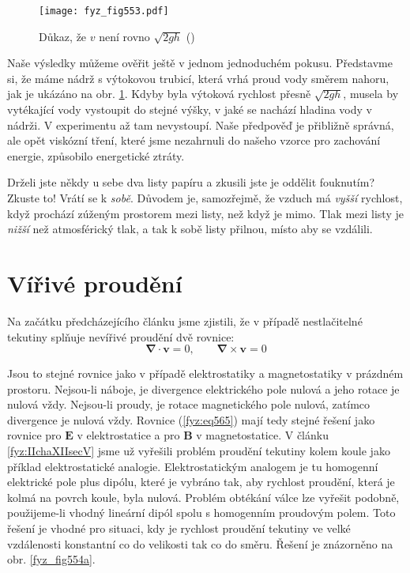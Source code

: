 {    \begin{figure}[ht!] %
      \centering
      \texttt{[image: fyz\_fig553.pdf]}
      \caption{Důkaz, že \(v\) není rovno \(\sqrt{2gh}\)
               (\cite[s.~751]{Feynman02})}
      \label{fyz_fig553}
    \end{figure}
    
    Naše výsledky můžeme ověřit ještě v jednom jednoduchém pokusu. Představme si, že máme nádrž s 
    výtokovou trubicí, která vrhá proud vody směrem nahoru, jak je ukázáno na obr. 
    \ref{fyz_fig553}. Kdyby byla výtoková rychlost přesně \(\sqrt{2gh}\), musela by vytékající vody 
    vystoupit do stejné výšky, v jaké se nachází hladina vody v nádrži. V experimentu až tam 
    nevystoupí. Naše předpověď je přibližně správná, ale opět viskózní tření, které jsme nezahrnuli 
    do našeho vzorce pro zachování energie, způsobilo energetické ztráty.
    
    Drželi jste někdy u sebe dva listy papíru a zkusili jste je oddělit fouknutím? Zkuste to! Vrátí 
    se k \emph{sobě}. Důvodem je, samozřejmě, že vzduch má \emph{vyšší} rychlost, když prochází 
    zúženým prostorem mezi listy, než když je mimo. Tlak mezi listy je \emph{nižší} než 
    atmosférický tlak, a tak k sobě listy přilnou, místo aby se vzdálili.
    
  \section{Vířivé proudění}\label{fyz:IIchapXLsecIV}
    Na začátku předcházejícího článku jsme zjistili, že v případě nestlačitelné tekutiny splňuje 
    nevířivé proudění dvě rovnice:
    \begin{equation}\label{fyz:eq565}
      \symbf{\nabla}\cdot\bm{v} = 0, \qquad \symbf{\nabla}\times\bm{v} = 0
    \end{equation}
    
    Jsou to stejné rovnice jako v případě elektrostatiky a magnetostatiky v prázdném prostoru. 
    Nejsou-li náboje, je divergence elektrického pole nulová a jeho rotace je nulová vždy. 
    Nejsou-li proudy, je rotace magnetického pole nulová, zatímco divergence je nulová vždy. 
    Rovnice (\ref{fyz:eq565}) mají tedy stejné řešení jako rovnice pro \(\bm{E}\) v elektrostatice 
    a pro \(\bm{B}\) v magnetostatice. V článku \ref{fyz:IIchaXIIsecV} jsme už vyřešili problém 
    proudění tekutiny kolem koule jako příklad elektrostatické analogie. Elektrostatickým analogem 
    je tu homogenní elektrické pole plus dipólu, které je vybráno tak, aby rychlost proudění, která 
    je kolmá na povrch koule, byla nulová. Problém obtékání válce lze vyřešit podobně, použijeme-li 
    vhodný lineární dipól spolu s homogenním proudovým polem. Toto řešení je vhodné pro situaci, 
    kdy je rychlost proudění tekutiny ve velké vzdálenosti konstantní co do velikosti tak co do 
    směru. Řešení je znázorněno na obr. \ref{fyz_fig554a}.
    
}
